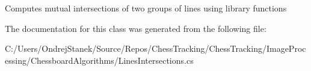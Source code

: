 Computes mutual intersections of two groups of lines using library functions 



The documentation for this class was generated from the following file\+:\begin{DoxyCompactItemize}
\item 
C\+:/\+Users/\+Ondrej\+Stanek/\+Source/\+Repos/\+Chess\+Tracking/\+Chess\+Tracking/\+Image\+Processing/\+Chessboard\+Algorithms/Lines\+Intersections.\+cs\end{DoxyCompactItemize}
